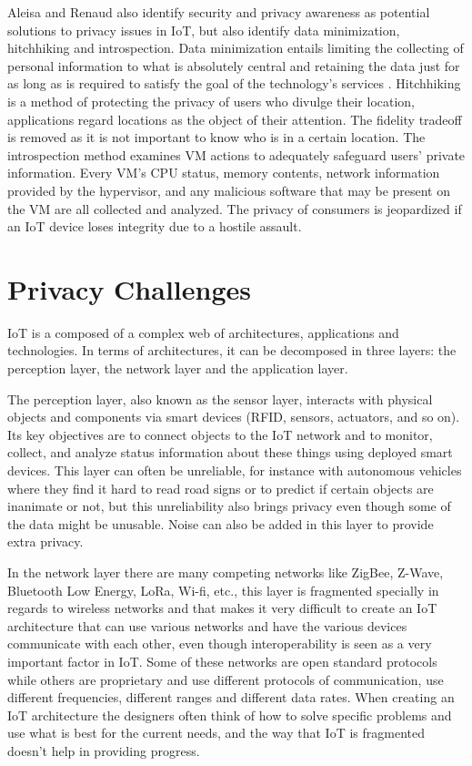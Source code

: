\documentclass[conference]{IEEEtran}
\begin{document}
Aleisa and Renaud \cite{aleisa2016privacy} also identify security and privacy
awareness as potential solutions to privacy issues in IoT, but also identify
data minimization, hitchhiking and introspection. Data minimization entails
limiting the collecting of personal information to what is absolutely central
and retaining the data just for as long as is required to satisfy the goal
of the technology's services \cite{ojDirective281}. Hitchhiking \cite{tang2006putting}
is a method of protecting the privacy of users who divulge their location,
applications regard locations as the object of their attention. The fidelity
tradeoff is removed as it is not important to know who is in a certain
location. The introspection \cite{kang2015protection} method examines VM
actions to adequately safeguard users' private information. Every VM's
CPU status, memory contents, network information provided by the hypervisor,
and any malicious software that may be present on the VM are all collected
and analyzed. The privacy of consumers is jeopardized if an IoT device
loses integrity due to a hostile assault.

\section{Privacy Challenges}

IoT is a composed of a complex web of architectures, applications and technologies.
In terms of architectures, it can be decomposed in three layers: the perception
layer, the network layer and the application layer.

The perception layer, also known as the sensor layer, interacts with physical
objects and components via smart devices (RFID, sensors, actuators, and so
on). Its key objectives are to connect objects to the IoT network and to monitor,
collect, and analyze status information about these things using deployed
smart devices. This layer can often be unreliable, for instance with autonomous
vehicles where they find it hard to read road signs or to predict if certain
objects are inanimate or not, but this unreliability also brings privacy
even though some of the data might be unusable. Noise can also be added
in this layer to provide extra privacy.

In the network layer there are many competing networks like ZigBee, Z-Wave,
Bluetooth Low Energy, LoRa, Wi-fi, etc., this layer is fragmented specially
in regards to wireless networks and that makes it very difficult to create
an IoT architecture that can use various networks and have the various
devices communicate with each other, even though interoperability is seen
as a very important factor in IoT. Some of these networks are open standard
protocols while others are proprietary and use different protocols of communication,
use different frequencies, different ranges and different data rates. When
creating an IoT architecture the designers often think of how to solve
specific problems and use what is best for the current needs, and the way
that IoT is fragmented doesn't help in providing progress.
\end{document}

